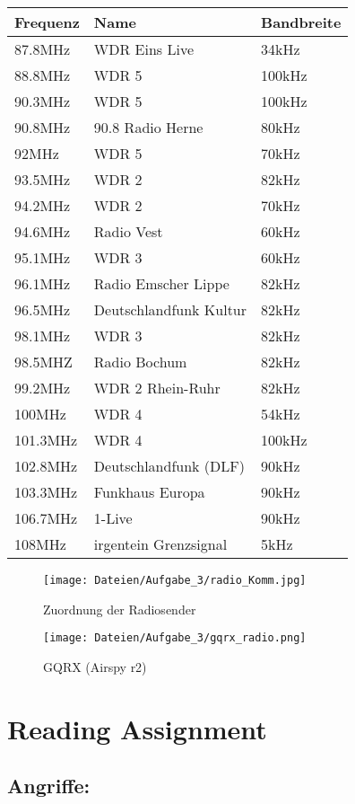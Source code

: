 \documentclass[12pt,a4paper]{article}
\begin{document}
\begin{table}[H]
\centering
\begin{tabular}{|l|l|l|}
\hline
Frequenz & Name & Bandbreite \\
\hline
87.8MHz & 	WDR Eins Live & 34kHz \\
\hline
88.8MHz & WDR 5 & 100kHz\\
\hline
90.3MHz & WDR 5 & 100kHz\\
\hline
90.8MHz & 90.8 Radio Herne & 80kHz \\
\hline
92MHz & WDR 5 & 70kHz\\
\hline
93.5MHz & WDR 2 & 82kHz \\
\hline
94.2MHz & WDR 2 & 70kHz\\
\hline 
94.6MHz & Radio Vest & 60kHz\\
\hline
95.1MHz & WDR 3 & 60kHz \\
\hline
96.1MHz & Radio Emscher Lippe & 82kHz\\
\hline
96.5MHz & Deutschlandfunk Kultur & 82kHz\\
\hline
98.1MHz & WDR 3 & 82kHz\\
\hline
98.5MHZ & Radio Bochum & 82kHz \\
\hline
99.2MHz & WDR 2 Rhein-Ruhr &82kHz\\
\hline
100MHz & WDR 4 & 54kHz \\
\hline
101.3MHz & WDR 4 & 100kHz \\
\hline
102.8MHz & Deutschlandfunk (DLF)&90kHz\\
\hline
103.3MHz & Funkhaus Europa & 90kHz\\
\hline
106.7MHz & 1-Live & 90kHz\\
\hline
108MHz & irgentein Grenzsignal & 5kHz\\
\hline
\end{tabular}
\end{table}
\begin{figure}[H]
\centering
\texttt{[image: Dateien/Aufgabe\_3/radio\_Komm.jpg]} 
\caption{Zuordnung der Radiosender}
\label{fig:3_3}
\end{figure}
\begin{figure}[H]
\centering
\texttt{[image: Dateien/Aufgabe\_3/gqrx\_radio.png]} 
\caption{GQRX (Airspy r2)}
\label{fig:3_4}
\end{figure}
\section{Reading Assignment}
\subsection*{Angriffe:}
\end{document}
